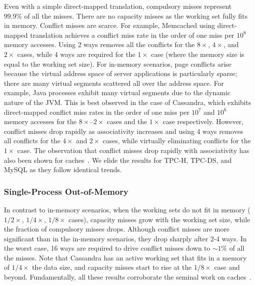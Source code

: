 Even with a simple direct-mapped translation, compulsory misses represent $99.9\%$ of all the misses. There are no capacity misses as the working set fully fits in memory. Conflict misses are scarce. For example, Memcached using direct-mapped translation achieves a conflict miss rate in the order of one miss per $10^{8}$ memory accesses. Using $2$ ways removes all the conflicts for the $8\times$, $4\times$, and $2\times$ cases, while $4$ ways are required for the $1\times$ case (where the memory size is equal to the working set size). For in-memory scenarios, page conflicts arise because the virtual address space of server applications is particularly sparse; there are many virtual segments scattered all over the address space. For example, Java processes exhibit many virtual segments due to the dynamic nature of the JVM. This is best observed in the case of Cassandra, which exhibits direct-mapped conflict miss rates in the order of one miss per $10^{7}$ and $10^{6}$ memory accesses for the $8\times$--$2\times$ cases and the $1\times$ case respectively. However, conflict misses drop rapidly as associativity increases and using 4 ways removes all conflicts for the $4\times$ and $2\times$ cases, while virtually eliminating conflicts for the $1\times$ case. The observation that conflict misses drop rapidly with associativity has also been shown for caches~\cite{hill:aspects, cantin:cache}. We elide the results for TPC-H, TPC-DS, and MySQL as they follow identical trends.

\subsubsection{Single-Process Out-of-Memory}

In contrast to in-memory scenarios, when the working sets do not fit in memory ($1/2\times$, $1/4\times$, $1/8\times$ cases), capacity misses grow with the working set size, while the fraction of compulsory misses drops. Although conflict misses are more significant than in the in-memory scenarios, they drop sharply after 2-4 ways. In the worst case, 16 ways are required to drive conflict misses down to $\sim1\%$ of all the misses. Note that Cassandra has an active working set that fits in a memory of $1/4\times$ the data size, and capacity misses start to rise at the $1/8\times$ case and beyond. Fundamentally, all these results corroborate the seminal work on caches~\cite{hill:aspects, cantin:cache}. 

